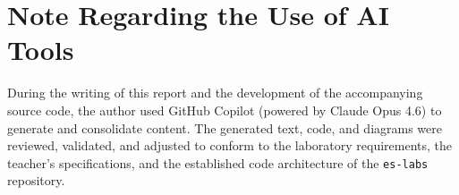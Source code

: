 \section{Note Regarding the Use of AI Tools}

During the writing of this report and the development of the accompanying source code, the author used GitHub Copilot (powered by Claude Opus 4.6) to generate and consolidate content. The generated text, code, and diagrams were reviewed, validated, and adjusted to conform to the laboratory requirements, the teacher's specifications, and the established code architecture of the \texttt{es-labs} repository.
